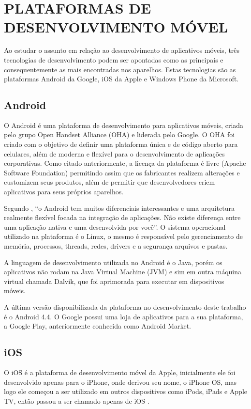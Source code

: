 \documentclass[
	12pt,				%
	openright,			%
	oneside,			%
	a4paper,			%
	chapter=TITLE,		%
	section=TITLE,		%
	english,			%
	french,				%
	spanish,			%
	brazil				%
	]{abntex2}
\begin{document}
\section{PLATAFORMAS DE DESENVOLVIMENTO MÓVEL}
Ao estudar o assunto em relação ao desenvolvimento de aplicativos móveis, três tecnologias de desenvolvimento podem ser apontadas como as principais e consequentemente as mais encontradas nos aparelhos. Estas tecnologias são as plataformas Android da Google, iOS da Apple e Windows Phone da Microsoft.

\subsection{Android}
O Android é uma plataforma de desenvolvimento para aplicativos móveis, criada pelo grupo Open Handset Alliance (OHA) e liderada pelo Google. O OHA foi criado com o objetivo de definir uma plataforma única e de código aberto para celulares, além de moderna e flexível para o desenvolvimento de aplicações corporativas. Como citado anteriormente, a licença da plataforma é livre (Apache Software Foundation) permitindo assim que os fabricantes realizem alterações e customizem seus produtos, além de permitir que desenvolvedores criem aplicativos para seus próprios aparelhos. 

Segundo , “o Android tem muitos diferenciais interessantes e uma arquitetura realmente flexível focada na integração de aplicações. Não existe diferença entre uma aplicação nativa e uma desenvolvida por você”. O sistema operacional utilizado na plataforma é o Linux, o mesmo é responsável pelo gerenciamento de memória, processos, threads, redes, drivers e a segurança arquivos e pastas. 

A linguagem de desenvolvimento utilizada no Android é o Java, porém os aplicativos não rodam na Java Virtual Machine (JVM) e sim em outra máquina virtual chamada Dalvik, que foi aprimorada para executar em dispositivos móveis. 

A última versão disponibilizada da plataforma no desenvolvimento deste trabalho é o Android 4.4. O Google possui uma loja de aplicativos para a sua plataforma, a Google Play, anteriormente conhecida como Android Market.

\subsection{iOS}
O iOS é a plataforma de desenvolvimento móvel da Apple, inicialmente ele foi desenvolvido apenas para o iPhone, onde derivou seu nome, o iPhone OS, mas logo ele começou a ser utilizado em outros dispositivos como iPods, iPads e Apple TV, então passou a ser chamado apenas de iOS \cite{milaniIOS}. 
\end{document}
